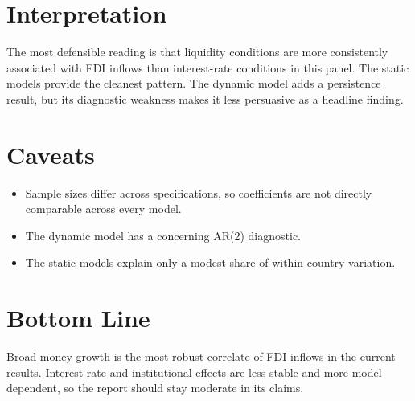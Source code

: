 \section{Interpretation}
\label{sec:interpretation}

The most defensible reading is that liquidity conditions are more consistently associated with FDI inflows than interest-rate conditions in this panel. The static models provide the cleanest pattern. The dynamic model adds a persistence result, but its diagnostic weakness makes it less persuasive as a headline finding.

\section{Caveats}
\label{sec:caveats}

\begin{itemize}
    \item Sample sizes differ across specifications, so coefficients are not directly comparable across every model.
    \item The dynamic model has a concerning AR(2) diagnostic.
    \item The static models explain only a modest share of within-country variation.
\end{itemize}

\section{Bottom Line}
\label{sec:bottom-line}

Broad money growth is the most robust correlate of FDI inflows in the current results. Interest-rate and institutional effects are less stable and more model-dependent, so the report should stay moderate in its claims.
